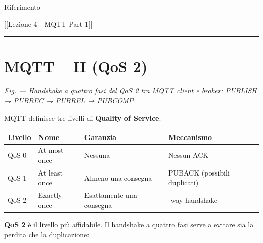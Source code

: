\documentclass[
  italian,
  openany]{book}
\newcounter{none} %
\begin{document}
\begin{calloutnote}{Riferimento}

{[}{[}Lezione 4 - MQTT Part 1{]}{]}

\end{calloutnote}

\begin{center}\rule{0.5\linewidth}{0.5pt}\end{center}

\section{MQTT -- II (QoS 2)}\label{mqtt-ii-qos-2}

\emph{Fig. --- Handshake a quattro fasi del QoS 2 tra MQTT client e
broker: PUBLISH → PUBREC → PUBREL → PUBCOMP.}

MQTT definisce tre livelli di \textbf{Quality of Service}:

{\def\LTcaptype{none} %
\begin{longtable}[]{@{}
  >{\raggedright\arraybackslash}p{}
  >{\raggedright\arraybackslash}p{}
  >{\raggedright\arraybackslash}p{}
  >{\raggedright\arraybackslash}p{}@{}}
\toprule\noalign{}
\begin{minipage}[b]{\linewidth}\raggedright
Livello
\end{minipage} & \begin{minipage}[b]{\linewidth}\raggedright
Nome
\end{minipage} & \begin{minipage}[b]{\linewidth}\raggedright
Garanzia
\end{minipage} & \begin{minipage}[b]{\linewidth}\raggedright
Meccanismo
\end{minipage} \\
\midrule\noalign{}
\endhead
\bottomrule\noalign{}
\endlastfoot
QoS 0 & At most once & Nessuna & Nessun ACK \\
QoS 1 & At least once & Almeno una consegna & PUBACK (possibili
duplicati) \\
QoS 2 & Exactly once & Esattamente una consegna & 4-way handshake \\
\end{longtable}
}

\textbf{QoS 2} è il livello più affidabile. Il handshake a quattro fasi
serve a evitare sia la perdita che la duplicazione:
\end{document}
